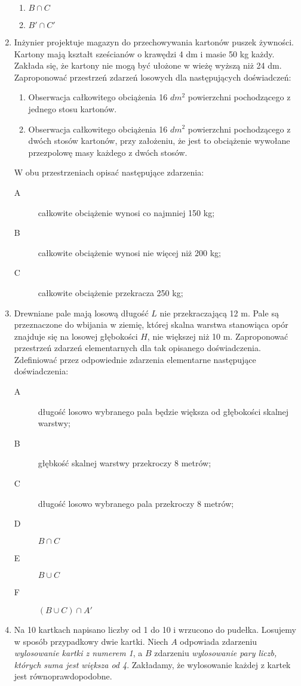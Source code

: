 \documentclass{mwart}
\begin{document}
\begin{enumerate}
\begin{enumerate}
\item $B\cap C$
\item $B'\cap C'$
\end{enumerate}
\item Inżynier projektuje magazyn do przechowywania kartonów puszek żywności. Kartony mają kształt sześcianów o krawędzi 4 dm i masie 50 kg każdy. Zakłada się, że kartony nie mogą być ułożone w wieżę wyższą niż 24 dm. Zaproponować przestrzeń zdarzeń losowych dla następujących doświadczeń:
\begin{enumerate}
\item Obserwacja całkowitego obciążenia 16 $dm^2$ powierzchni pochodzącego z jednego stosu kartonów.
\item Obserwacja całkowitego obciążenia 16 $dm^2$ powierzchni pochodzącego z dwóch stosów kartonów, przy założeniu, że jest to obciążenie wywołane przezpolowę masy każdego z dwóch stosów.
\end{enumerate}
W obu przestrzeniach opisać następujące zdarzenia:
\begin{description}
\item[A] całkowite obciążenie wynosi co najmniej 150 kg;
\item[B] całkowite obciążenie wynosi nie więcej niż 200 kg;
\item[C] całkowite obciążenie przekracza 250 kg;
\end{description}
\item  Drewniane pale mają losową długość $L$ nie przekraczającą 12 m. Pale są przeznaczone do wbijania w ziemię, której skalna warstwa stanowiąca opór znajduje się na losowej głębokości $H$, nie większej niż 10 m. Zaproponować przestrzeń zdarzeń elementarnych dla tak opisanego doświadczenia. Zdefiniować przez odpowiednie zdarzenia elementarne następujące doświadczenia:
\begin{description}
\item[A] długość losowo wybranego pala będzie większa od głębokości skalnej warstwy;
\item[B] głębkość skalnej warstwy przekroczy 8 metrów;
\item[C] długość losowo wybranego pala przekroczy 8 metrów;
\item[D] $B\cap C$
\item[E] $B\cup C$
\item[F] $(B\cup C)\cap A'$
\end{description}
\item Na 10 kartkach napisano liczby od 1 do 10 i wrzucono do pudełka. Losujemy w sposób przypadkowy dwie kartki. Niech $A$ odpowiada zdarzeniu \emph{wylosowanie kartki z numerem 1}, a $B$ zdarzeniu \emph{wylosowanie pary liczb, których suma jest większa od 4}. Zakładamy, że wylosowanie każdej z kartek jest równoprawdopodobne.

\end{enumerate}
\end{document}
